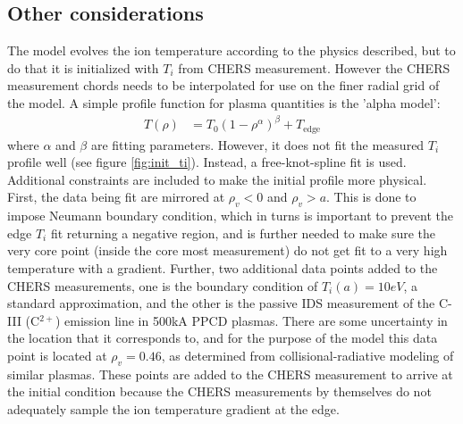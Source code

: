 \subsection{Other considerations}

The model evolves the ion temperature according to the physics described, but to do that it is initialized with $T_i$ from CHERS measurement. However the CHERS measurement chords needs to be interpolated for use on the finer radial grid of the model. 
A simple profile function for plasma quantities is the 'alpha model':
\begin{align}
    T(\rho) &= T_0(1 - \rho^\alpha)^\beta + T_{\text{edge}}
\end{align}
where $\alpha$ and $\beta$ are fitting parameters. However, it does not fit the measured $T_i$ profile well (see figure \ref{fig:init_ti}). Instead, a free-knot-spline fit is used. Additional constraints are included to make the initial profile more physical. 
First, the data being fit are mirrored at $\rho_v < 0$ and $\rho_v > a$. This is done to impose Neumann boundary condition, which in turns is important to prevent the edge $T_i$ fit returning a negative region, and is further needed to make sure the very core point (inside the core most measurement) do not get fit to a very high temperature with a gradient. Further, two additional data points added to the CHERS measurements, one is the boundary condition of $T_i(a) = 10eV$, a standard approximation, and the other is the passive IDS measurement of the C-III (C$^{2+}$) emission line in 500kA PPCD plasmas. There are some uncertainty in the location that it corresponds to, and for the purpose of the model this data point is located at $\rho_v = 0.46$, as determined from collisional-radiative modeling of similar plasmas\cite{Nishizawa2018,Barbui2014}. These points are added to the CHERS measurement to arrive at the initial condition because the CHERS measurements by themselves do not adequately sample the ion temperature gradient at the edge.

